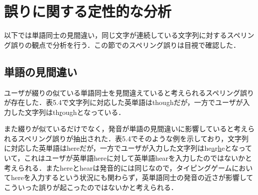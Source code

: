 \begin{comment}
表5.3と表5.4は上位10件の置換前の文字と置換後の文字のペアを示している．表5.3と表5.4を比較すると，表5.3においてxとc，vとc，jとhなど隣接するキー配置による打鍵誤りからもたらされるスペリング誤りが10件中8件見られ，表5.4ではzとs，xとsのような打鍵誤りからもたらされるスペリング誤りが10件中4件見られタイピングゲームを用いたスペリング誤りと通常のスペリング誤りで違いが見られた．表5.3においてbとvの置換もよく見られ，このスペリング誤りの原因は打鍵誤りによるものと日本人特有のローマ字の使用による影響と考えられるが，同じくローマ字の使用による影響によって起きるrとlの置換は表5.1に示すように本研究においてはあまり起こらなかったため，タイピングゲームのような表示された文字を書き写す状況ではローマ字の使用による影響をあまり受けず，打鍵誤りにより引き起こされる置換が通常のスペリング誤りに比べよく起きることが示唆された．
\end{comment}

\section{誤りに関する定性的な分析}

以下では単語同士の見間違い，同じ文字が連続している文字列に対するスペリング誤りの観点で分析を行う．この節でのスペリング誤りは目視で確認した．

\subsection{単語の見間違い}
ユーザが綴りの似ている単語同士を見間違えていると考えられるスペリング誤りが存在した．表5.4で文字列に対応した英単語はthoughだが，一方でユーザが入力した文字列はth\underline{r}oughとなっている．
\begin{comment}
これは本研究のようにユーザが入力しようとしている文字列がわからなければ抽出できない事例である．
またWheelerの研究\cite{wheeler1970processes}において人間は単語を文字や音素のような要素を逐次処理することで認識するのではなく，分けられない単体として認識している可能性があることが指摘されており，この事例はそれに伴った結果であると考えられる．
\end{comment}

また綴りが似ているだけでなく，発音が単語の見間違いに影響していると考えられるスペリング誤りが抽出された．表5.4でそのような例を示しており，文字列に対応した英単語はhereだが，一方でユーザが入力した文字列はhe\underline{a}r\underline{h}eとなっていて，これはユーザが英単語hereに対して英単語hearを入力したのではないかと考えられる．またhereとhearは発音的には同じなので，タイピングゲームにおいてhereを入力するという状況にも関わらず，英単語同士の発音の近さが影響してこういった誤りが起こったのではないかと考えられる．

